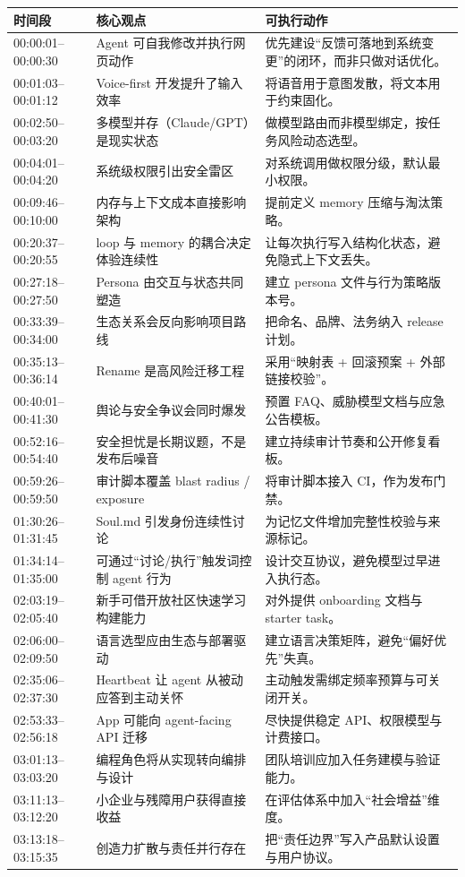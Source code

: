 \documentclass[a4paper]{article}
\begin{document}
\begin{longtable}{p{}p{}p{}}
\toprule
\textbf{时间段} & \textbf{核心观点} & \textbf{可执行动作} \\
\midrule
00:00:01--00:00:30 & Agent 可自我修改并执行网页动作 & 优先建设“反馈可落地到系统变更”的闭环，而非只做对话优化。 \\
\midrule
00:01:03--00:01:12 & Voice-first 开发提升了输入效率 & 将语音用于意图发散，将文本用于约束固化。 \\
\midrule
00:02:50--00:03:20 & 多模型并存（Claude/GPT）是现实状态 & 做模型路由而非模型绑定，按任务风险动态选型。 \\
\midrule
00:04:01--00:04:20 & 系统级权限引出安全雷区 & 对系统调用做权限分级，默认最小权限。 \\
\midrule
00:09:46--00:10:00 & 内存与上下文成本直接影响架构 & 提前定义 memory 压缩与淘汰策略。 \\
\midrule
00:20:37--00:20:55 & loop 与 memory 的耦合决定体验连续性 & 让每次执行写入结构化状态，避免隐式上下文丢失。 \\
\midrule
00:27:18--00:27:50 & Persona 由交互与状态共同塑造 & 建立 persona 文件与行为策略版本号。 \\
\midrule
00:33:39--00:34:00 & 生态关系会反向影响项目路线 & 把命名、品牌、法务纳入 release 计划。 \\
\midrule
00:35:13--00:36:14 & Rename 是高风险迁移工程 & 采用“映射表 + 回滚预案 + 外部链接校验”。 \\
\midrule
00:40:01--00:41:30 & 舆论与安全争议会同时爆发 & 预置 FAQ、威胁模型文档与应急公告模板。 \\
\midrule
00:52:16--00:54:40 & 安全担忧是长期议题，不是发布后噪音 & 建立持续审计节奏和公开修复看板。 \\
\midrule
00:59:26--00:59:50 & 审计脚本覆盖 blast radius / exposure & 将审计脚本接入 CI，作为发布门禁。 \\
\midrule
01:30:26--01:31:45 & Soul.md 引发身份连续性讨论 & 为记忆文件增加完整性校验与来源标记。 \\
\midrule
01:34:14--01:35:00 & 可通过“讨论/执行”触发词控制 agent 行为 & 设计交互协议，避免模型过早进入执行态。 \\
\midrule
02:03:19--02:05:40 & 新手可借开放社区快速学习构建能力 & 对外提供 onboarding 文档与 starter task。 \\
\midrule
02:06:00--02:09:50 & 语言选型应由生态与部署驱动 & 建立语言决策矩阵，避免“偏好优先”失真。 \\
\midrule
02:35:06--02:37:30 & Heartbeat 让 agent 从被动应答到主动关怀 & 主动触发需绑定频率预算与可关闭开关。 \\
\midrule
02:53:33--02:56:18 & App 可能向 agent-facing API 迁移 & 尽快提供稳定 API、权限模型与计费接口。 \\
\midrule
03:01:13--03:03:20 & 编程角色将从实现转向编排与设计 & 团队培训应加入任务建模与验证能力。 \\
\midrule
03:11:13--03:12:20 & 小企业与残障用户获得直接收益 & 在评估体系中加入“社会增益”维度。 \\
\midrule
03:13:18--03:15:35 & 创造力扩散与责任并行存在 & 把“责任边界”写入产品默认设置与用户协议。 \\
\bottomrule
\end{longtable}
\end{document}
